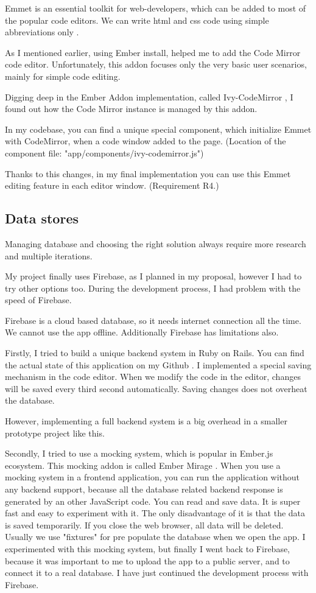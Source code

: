 \documentclass[11pt, a4paper, oneside, openright, medskipamount]{report}
\begin{document}
Emmet is an essential toolkit for web-developers, which can be added to most of the popular code editors. We can write html and css code using simple abbreviations only \cite{emmet}.

As I mentioned earlier, using Ember install, helped me to add the Code Mirror code editor. Unfortunately, this addon focuses only the very basic user scenarios, mainly for simple code editing.

Digging deep in the Ember Addon implementation, called Ivy-CodeMirror \cite{ivy-codemirror}, I found out how the Code Mirror instance is managed by this addon.

In my codebase, you can find a unique special component, which initialize Emmet with CodeMirror, when a code window added to the page. (Location of the component file: "app/components/ivy-codemirror.js")

Thanks to this changes, in my final implementation you can use this Emmet editing feature in each editor window. (Requirement R4.)

\subsection{Data stores}

Managing database and choosing the right solution always require more research and multiple iterations.

My project finally uses Firebase, as I planned in my proposal, however I had to try other options too. During the development process, I had problem with the speed of Firebase.

Firebase is a cloud based database, so it needs internet connection all the time. We cannot use the app offline. Additionally Firebase has limitations also.

Firstly, I tried to build a unique backend system in Ruby on Rails. You can find the actual state of this application on my Github \cite{tutorial-builder-backend}. I implemented a special saving mechanism in the code editor. When we modify the code in the editor, changes will be saved every third second automatically. Saving changes does not overheat the database.

However, implementing a full backend system is a big overhead in a smaller prototype project like this.

Secondly, I tried to use a mocking system, which is popular in Ember.js ecosystem. This mocking addon is called Ember Mirage \cite{ember-mirage}. When you use a mocking system in a frontend application, you can run the application without any backend support, because all the database related backend response is generated by an other JavaScript code. You can read and save data. It is super fast and easy to experiment with it. The only disadvantage of it is that the data is saved temporarily. If you close the web browser, all data will be deleted. Usually we use "fixtures" for pre populate the database when we open the app. I experimented with this mocking system, but finally I went back to Firebase, because it was important to me to upload the app to a public server, and to connect it to a real database. I have just continued the development process with Firebase.
\end{document}
